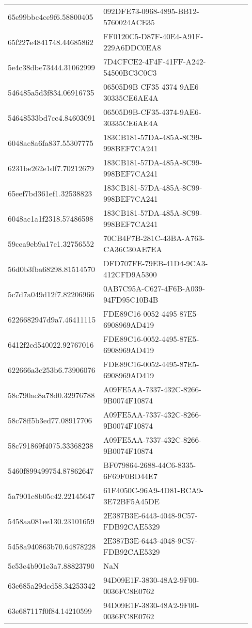 \begin{tabular}{ll}
65e99bbc4ce9f6.58800405 & 092DFE73-0968-4895-BB12-5760024ACE35 \\
65f227e4841748.44685862 & FF0120C5-D87F-40E4-A91F-229A6DDC0EA8 \\
5e4c38dbe73444.31062999 & 7D4CFCE2-4F4F-41FF-A242-54500BC3C0C3 \\
546485a5d3f834.06916735 & 06505D9B-CF35-4374-9AE6-30335CE6AE4A \\
54648533bd7ce4.84603091 & 06505D9B-CF35-4374-9AE6-30335CE6AE4A \\
6048ac8a6fa837.55307775 & 183CB181-57DA-485A-8C99-998BEF7CA241 \\
6231be262e1df7.70212679 & 183CB181-57DA-485A-8C99-998BEF7CA241 \\
65eef7bd361ef1.32538823 & 183CB181-57DA-485A-8C99-998BEF7CA241 \\
6048ac1a1f2318.57486598 & 183CB181-57DA-485A-8C99-998BEF7CA241 \\
59cea9eb9a17c1.32756552 & 70CB4F7B-281C-43BA-A763-CA36C30AE7EA \\
56d0b3fba68298.81514570 & DFD707FE-79EB-41D4-9CA3-412CFD9A5300 \\
5c7d7a049d12f7.82206966 & 0AB7C95A-C627-4F6B-A039-94FD95C10B4B \\
6226682947d9a7.46411115 & FDE89C16-0052-4495-87E5-6908969AD419 \\
6412f2cd540022.92767016 & FDE89C16-0052-4495-87E5-6908969AD419 \\
622666a3c253b6.73906076 & FDE89C16-0052-4495-87E5-6908969AD419 \\
58c790ac8a78d0.32976788 & A09FE5AA-7337-432C-8266-9B0074F10874 \\
58c78ff5b3ed77.08917706 & A09FE5AA-7337-432C-8266-9B0074F10874 \\
58c791869f4075.33368238 & A09FE5AA-7337-432C-8266-9B0074F10874 \\
5460f899499754.87862647 & BF079864-2688-44C6-8335-6F69F0BD44E7 \\
5a7901c8b05c42.22145647 & 61F4050C-96A9-4D81-BCA9-3E72BF5A45DE \\
5458aa081ee130.23101659 & 2E387B3E-6443-4048-9C57-FDB92CAE5329 \\
5458a940863b70.64878228 & 2E387B3E-6443-4048-9C57-FDB92CAE5329 \\
5e53e4b901e3a7.88823790 & NaN \\
63e685a29dcd58.34253342 & 94D09E1F-3830-48A2-9F00-0036FC8E0762 \\
63e687117f0f84.14210599 & 94D09E1F-3830-48A2-9F00-0036FC8E0762 \\

\end{tabular}
